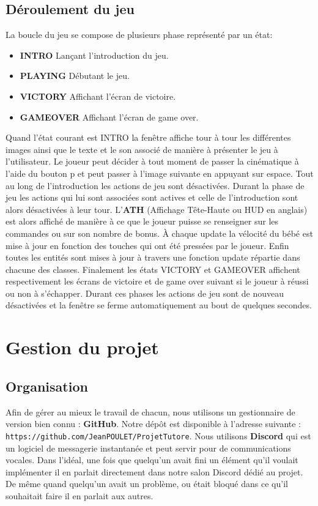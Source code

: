 \documentclass{article}
\begin{document}
\newpage

\subsection{Déroulement du jeu}
La boucle du jeu se compose de plusieurs phase représenté par un état:
    \begin{itemize}
        \item \textbf{INTRO} Lançant l'introduction du jeu.
        \item \textbf{PLAYING} Débutant le jeu.
        \item \textbf{VICTORY} Affichant l'écran de victoire.
        \item \textbf{GAMEOVER} Affichant l'écran de game over.
    \end{itemize}\bigbreak
Quand l'état courant est INTRO la fenêtre affiche tour à tour les différentes images ainsi que le texte et le son associé de manière à présenter le jeu à l'utilisateur. Le joueur peut décider à tout moment de passer la cinématique à l'aide du bouton p et peut passer à l'image suivante en appuyant sur espace. Tout au long de l'introduction les actions de jeu sont désactivées.\bigbreak
Durant la phase de jeu les actions qui lui sont associées sont actives et celle de l'introduction sont alors désactivées à leur tour. L'\textbf{ATH} (Affichage Tête-Haute ou HUD en anglais) est alors affiché de manière à ce que le joueur puisse se renseigner sur les commandes ou sur son nombre de bonus.
À chaque update la vélocité du bébé est mise à jour en fonction des touches qui ont été pressées par le joueur. Enfin toutes les entités sont mises à jour à travers une fonction update répartie dans chacune des classes.\bigbreak
Finalement les états VICTORY et GAMEOVER affichent respectivement les écrans de victoire et de game over suivant si le joueur à réussi ou non à s'échapper. Durant ces phases les actions de jeu sont de nouveau désactivées et la fenêtre se ferme automatiquement au bout de quelques secondes. 

\section{Gestion du projet}

\subsection{Organisation}
Afin de gérer au mieux le travail de chacun, nous utilisons un gestionnaire de version bien connu : \textbf{GitHub}.
Notre dépôt est disponible à l'adresse suivante : \texttt{https://github.com/JeanPOULET/ProjetTutore}.
Nous utilisons \textbf{Discord} qui est un logiciel de messagerie instantanée et peut servir pour de communications vocales. Dans l'idéal, une fois que quelqu'un avait fini un élément qu'il voulait implémenter il en parlait directement dans notre salon Discord dédié au projet. De même quand quelqu'un avait un problème, ou était bloqué dans ce qu'il souhaitait faire il en parlait aux autres.
\end{document}
